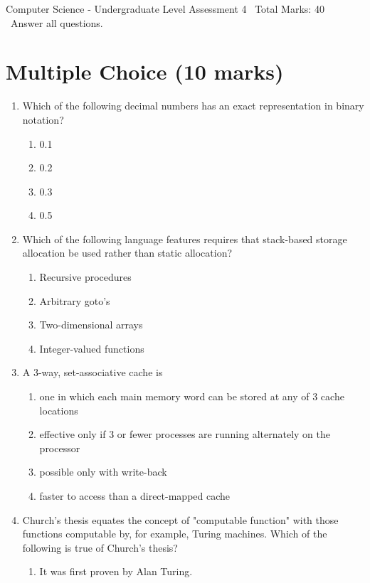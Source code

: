 \documentclass[12pt]{article}
\begin{document}
\begin{center}
Computer Science - Undergraduate Level Assessment 4 \
Total Marks: 40 \
Answer all questions.
\end{center}

\section*{Multiple Choice (10 marks)}
\begin{enumerate}[label=\arabic*.]
\item Which of the following decimal numbers has an exact representation in binary notation?
\begin{enumerate}[label=(\alph*)]
    \item 0.1
    \item 0.2
    \item 0.3
    \item 0.5
\end{enumerate}
\item Which of the following language features requires that stack-based storage allocation be
used rather than static allocation?
\begin{enumerate}[label=(\alph*)]
    \item Recursive procedures
    \item Arbitrary goto's
    \item Two-dimensional arrays
    \item Integer-valued functions
\end{enumerate}
\item A 3-way, set-associative cache is
\begin{enumerate}[label=(\alph*)]
    \item one in which each main memory word can be stored at any of 3 cache locations
    \item effective only if 3 or fewer processes are running alternately on the processor
    \item possible only with write-back
    \item faster to access than a direct-mapped cache
\end{enumerate}
\item Church's thesis equates the concept of "computable function" with those functions
computable by, for example, Turing machines. Which of the following is true of Church's
thesis?
\begin{enumerate}[label=(\alph*)]
    \item It was first proven by Alan Turing.

\end{enumerate}
\end{enumerate}
\end{document}
